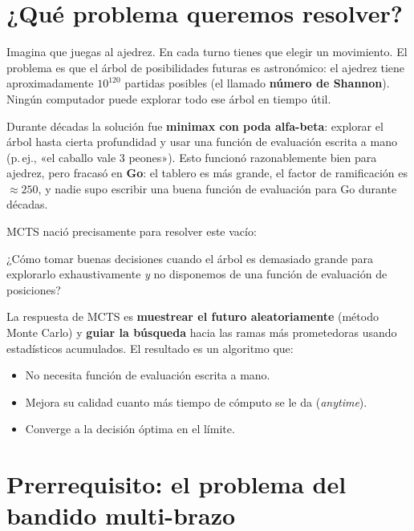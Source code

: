 \documentclass[12pt, a4paper]{article}
\begin{document}
\section{¿Qué problema queremos resolver?}

Imagina que juegas al ajedrez. En cada turno tienes que elegir un movimiento.
El problema es que el árbol de posibilidades futuras es astronómico: el ajedrez
tiene aproximadamente $10^{120}$ partidas posibles (el llamado \textbf{número
de Shannon}). Ningún computador puede explorar todo ese árbol en tiempo útil.

Durante décadas la solución fue \textbf{minimax con poda alfa-beta}: explorar
el árbol hasta cierta profundidad y usar una función de evaluación escrita a
mano (p.\,ej., «el caballo vale 3 peones»). Esto funcionó razonablemente bien
para ajedrez, pero fracasó en \textbf{Go}: el tablero es más grande, el factor
de ramificación es $\approx 250$, y nadie supo escribir una buena función de
evaluación para Go durante décadas.

MCTS nació precisamente para resolver este vacío:

\begin{tcolorbox}[clave]
¿Cómo tomar buenas decisiones cuando el árbol es demasiado grande para
explorarlo exhaustivamente \emph{y} no disponemos de una función de evaluación
de posiciones?
\end{tcolorbox}

La respuesta de MCTS es \textbf{muestrear el futuro aleatoriamente} (método
Monte Carlo) y \textbf{guiar la búsqueda} hacia las ramas más prometedoras
usando estadísticos acumulados. El resultado es un algoritmo que:

\begin{itemize}
  \item No necesita función de evaluación escrita a mano.
  \item Mejora su calidad cuanto más tiempo de cómputo se le da (\emph{anytime}).
  \item Converge a la decisión óptima en el límite.
\end{itemize}

\section{Prerrequisito: el problema del bandido multi-brazo}
\end{document}
